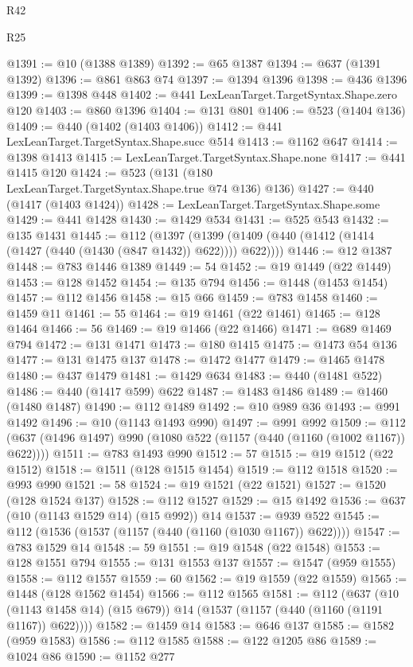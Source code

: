 \begin{lexlean}{R42}
\begin{lexlean}{R25}
\begin{coremodule}
{{{{{{{{{{{{{{{{{{{{{{{{{{{{{{{{{{{{{{{{{{{{{{{{{{{{{{{{{{{{{{{{{{{{{{{{{{{{{{{{{{{{{{{{{{{{{{{{{{{{{{{{{{{{{{{{{{{{{{{{{{{{{{{{{{{{{{{{{{{{{{{{{{{{{{{{{{{{{{{{{{{{{{{{{{{{{{{{{{{{{{{{{{{{{{{{{{{{{{{@1391 := @10 (@1388 @1389)
@1392 := @65 @1387
@1394 := @637 (@1391 @1392)
@1396 := @861 @863 @74
@1397 := @1394 @1396
@1398 := @436 @1396
@1399 := @1398 @448
@1402 := @441 LexLeanTarget.TargetSyntax.Shape.zero @120
@1403 := @860 @1396
@1404 := @131 @801
@1406 := @523 (@1404 @136)
@1409 := @440 (@1402 (@1403 @1406))
@1412 := @441 LexLeanTarget.TargetSyntax.Shape.succ @514
@1413 := @1162 @647
@1414 := @1398 @1413
@1415 := LexLeanTarget.TargetSyntax.Shape.none
@1417 := @441 @1415 @120
@1424 := @523 (@131 (@180 LexLeanTarget.TargetSyntax.Shape.true @74 @136) @136)
@1427 := @440 (@1417 (@1403 @1424))
@1428 := LexLeanTarget.TargetSyntax.Shape.some
@1429 := @441 @1428
@1430 := @1429 @534
@1431 := @525 @543
@1432 := @135 @1431
@1445 := @112
    (@1397 (@1399 (@1409 (@440 (@1412 (@1414 (@1427 (@440 (@1430 (@847 @1432)) @622)))) @622))))
@1446 := @12 @1387
@1448 := @783 @1446 @1389
@1449 := 54
@1452 := @19 @1449 (@22 @1449)
@1453 := @128 @1452
@1454 := @135 @794
@1456 := @1448 (@1453 @1454)
@1457 := @112 @1456
@1458 := @15 @66
@1459 := @783 @1458
@1460 := @1459 @11
@1461 := 55
@1464 := @19 @1461 (@22 @1461)
@1465 := @128 @1464
@1466 := 56
@1469 := @19 @1466 (@22 @1466)
@1471 := @689 @1469 @794
@1472 := @131 @1471
@1473 := @180 @1415
@1475 := @1473 @54 @136
@1477 := @131 @1475 @137
@1478 := @1472 @1477
@1479 := @1465 @1478
@1480 := @437 @1479
@1481 := @1429 @634
@1483 := @440 (@1481 @522)
@1486 := @440 (@1417 @599) @622
@1487 := @1483 @1486
@1489 := @1460 (@1480 @1487)
@1490 := @112 @1489
@1492 := @10 @989 @36
@1493 := @991 @1492
@1496 := @10 (@1143 @1493 @990)
@1497 := @991 @992
@1509 := @112 (@637 (@1496 @1497) @990 (@1080 @522 (@1157 (@440 (@1160 (@1002 @1167)) @622))))
@1511 := @783 @1493 @990
@1512 := 57
@1515 := @19 @1512 (@22 @1512)
@1518 := @1511 (@128 @1515 @1454)
@1519 := @112 @1518
@1520 := @993 @990
@1521 := 58
@1524 := @19 @1521 (@22 @1521)
@1527 := @1520 (@128 @1524 @137)
@1528 := @112 @1527
@1529 := @15 @1492
@1536 := @637 (@10 (@1143 @1529 @14) (@15 @992)) @14
@1537 := @939 @522
@1545 := @112 (@1536 (@1537 (@1157 (@440 (@1160 (@1030 @1167)) @622))))
@1547 := @783 @1529 @14
@1548 := 59
@1551 := @19 @1548 (@22 @1548)
@1553 := @128 @1551 @794
@1555 := @131 @1553 @137
@1557 := @1547 (@959 @1555)
@1558 := @112 @1557
@1559 := 60
@1562 := @19 @1559 (@22 @1559)
@1565 := @1448 (@128 @1562 @1454)
@1566 := @112 @1565
@1581 := @112
    (@637 (@10 (@1143 @1458 @14) (@15 @679)) @14 (@1537 (@1157 (@440 (@1160 (@1191 @1167)) @622))))
@1582 := @1459 @14
@1583 := @646 @137
@1585 := @1582 (@959 @1583)
@1586 := @112 @1585
@1588 := @122 @1205 @86
@1589 := @1024 @86
@1590 := @1152 @277
}}}}}}}}}}}}}}}}}}}}}}}}}}}}}}}}}}}}}}}}}}}}}}}}}}}}}}}}}}}}}}}}}}}}}}}}}}}}}}}}}}}}}}}}}}}}}}}}}}}}}}}}}}}}}}}}}}}}}}}}}}}}}}}}}}}}}}}}}}}}}}}}}}}}}}}}}}}}}}}}}}}}}}}}}}}}}}}}}}}}}}}}}}}}}}}}}}}}}}}
\end{coremodule}
\end{lexlean}
\end{lexlean}
